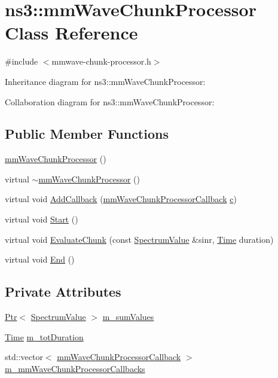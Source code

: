 \hypertarget{classns3_1_1mmWaveChunkProcessor}{}\section{ns3\+:\+:mm\+Wave\+Chunk\+Processor Class Reference}
\label{classns3_1_1mmWaveChunkProcessor}


{\ttfamily \#include $<$mmwave-\/chunk-\/processor.\+h$>$}



Inheritance diagram for ns3\+:\+:mm\+Wave\+Chunk\+Processor\+:


Collaboration diagram for ns3\+:\+:mm\+Wave\+Chunk\+Processor\+:
\subsection*{Public Member Functions}
\begin{DoxyCompactItemize}
\item 
\hyperlink{classns3_1_1mmWaveChunkProcessor_a9519c8884b7252c8eb46178457962e88}{mm\+Wave\+Chunk\+Processor} ()
\item 
virtual \hyperlink{classns3_1_1mmWaveChunkProcessor_ac4766ad89f8c9c0c6f47937949ad4e2b}{$\sim$mm\+Wave\+Chunk\+Processor} ()
\item 
virtual void \hyperlink{classns3_1_1mmWaveChunkProcessor_a8085a0f5b48d12dce448064b5a843c2f}{Add\+Callback} (\hyperlink{namespacens3_a30483c3f068c2b0abc969d692774446b}{mm\+Wave\+Chunk\+Processor\+Callback} \hyperlink{mmwave_2model_2fading-traces_2fading__trace__generator_8m_ae0323a9039add2978bf5b49550572c7c}{c})
\item 
virtual void \hyperlink{classns3_1_1mmWaveChunkProcessor_a31acf437939b776d98d102eb64a2df1a}{Start} ()
\item 
virtual void \hyperlink{classns3_1_1mmWaveChunkProcessor_ae9cc8006cacecc7b830adf3c00483623}{Evaluate\+Chunk} (const \hyperlink{classns3_1_1SpectrumValue}{Spectrum\+Value} \&sinr, \hyperlink{classns3_1_1Time}{Time} duration)
\item 
virtual void \hyperlink{classns3_1_1mmWaveChunkProcessor_a9e5160c452f67038d63a5b0b1f08406a}{End} ()
\end{DoxyCompactItemize}
\subsection*{Private Attributes}
\begin{DoxyCompactItemize}
\item 
\hyperlink{classns3_1_1Ptr}{Ptr}$<$ \hyperlink{classns3_1_1SpectrumValue}{Spectrum\+Value} $>$ \hyperlink{classns3_1_1mmWaveChunkProcessor_a1a747955a75920e536fa0106f941fb8b}{m\+\_\+sum\+Values}
\item 
\hyperlink{classns3_1_1Time}{Time} \hyperlink{classns3_1_1mmWaveChunkProcessor_a0b8475d6ba62803eff5db7ae3d23049e}{m\+\_\+tot\+Duration}
\item 
std\+::vector$<$ \hyperlink{namespacens3_a30483c3f068c2b0abc969d692774446b}{mm\+Wave\+Chunk\+Processor\+Callback} $>$ \hyperlink{classns3_1_1mmWaveChunkProcessor_a21edc5971d3aad6b36fb74f6802bb144}{m\+\_\+mm\+Wave\+Chunk\+Processor\+Callbacks}
\end{DoxyCompactItemize}
